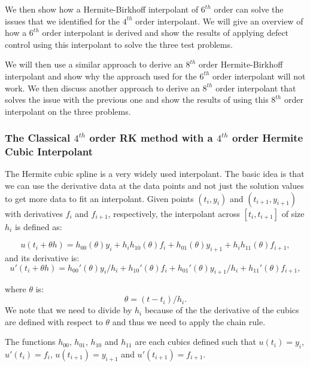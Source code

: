 \documentclass{article}
\begin{document}
We then show how a Hermite-Birkhoff interpolant of $6^{th}$ order can solve the issues that we identified for the $4^{th}$ order interpolant. We will give an overview of how a $6^{th}$ order interpolant is derived and show the results of applying defect control using this interpolant to solve the three test problems. 

We will then use a similar approach to derive an $8^{th}$ order Hermite-Birkhoff interpolant and show why the approach used for the $6^{th}$ order interpolant will not work. We then discuss another approach to derive an $8^{th}$ order interpolant that solves the issue with the previous one and show the results of using this $8^{th}$ order interpolant on the three problems.


\subsubsection{The Classical $4^{th}$ order RK method with a $4^{th}$ order Hermite Cubic Interpolant}
The Hermite cubic spline is a very widely used interpolant. The basic idea is that we can use the derivative data at the data points and not just the solution values to get more data to fit an interpolant. Given points $(t_i, y_i)$ and $(t_{i + 1}, y_{i + 1})$ with derivatives $f_i$ and $f_{i + 1}$, respectively, the interpolant across $[t_i, t_{i + 1}]$ of size $h_i$ is defined as:

\begin{equation}
\label{eqn:HB4}
u(t_i + \theta h) = h_{00}(\theta)y_i +  h_ih_{10}(\theta)f_i + h_{01}(\theta)y_{i + 1} + h_ih_{11}(\theta)f_{i + 1}, 
\end{equation}
and its derivative is:
\begin{equation}
u'(t_i + \theta h) = h_{00}'(\theta)y_i/h_i +  h_{10}'(\theta)f_i + h_{01}'(\theta)y_{i + 1}/h_i + h_{11}'(\theta)f_{i + 1}, 
\end{equation}

where $\theta$ is:
\begin{equation}
\label{eqn:HB4_theta}
\theta = (t - t_i) / h_i.
\end{equation}
We note that we need to divide by $h_i$ because of the the derivative of the cubics are defined with respect to $\theta$ and thus we need to apply the chain rule.

The functions $h_{00}$, $h_{01}$, $h_{10}$ and $h_{11}$ are each cubics defined such that $u(t_i)= y_i$, $u'(t_i) = f_i$, $u(t_{i+1}) = y_{i + 1}$ and $u'(t_{i + 1}) = f_{i + 1}$.
\end{document}

